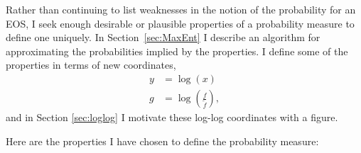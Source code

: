\documentclass[]{article}
\newcommand{\nomf}{\tilde f} \newcommand{\COST}{\cal C}
\newcommand\logx{y}
\newcommand\logf{g}
\begin{document}
Rather than continuing to list weaknesses in the notion of the
probability for an EOS, I seek enough desirable or plausible
properties of a probability measure to define one uniquely.  In
Section~\ref{sec:MaxEnt} I describe an algorithm for approximating the
probabilities implied by the properties.  I define some of the
properties in terms of new coordinates,
\begin{subequations}
  \label{eq:loglog}
  \begin{align}
    \logx &= \log(x) \\
    \logf &= \log\left( \frac{f}{\nomf} \right),
  \end{align}
\end{subequations}
and in Section \ref{sec:loglog} I motivate these log-log coordinates
with a figure.

Here are the properties I have chosen to define the probability measure:
\newcommand{\measure}{\mu}
\end{document}

